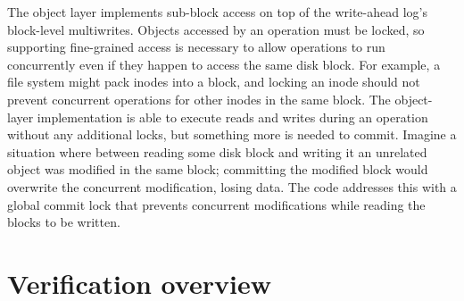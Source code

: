 The object layer implements sub-block access on top of the write-ahead
log's block-level multiwrites. Objects accessed by an operation must be locked,
so supporting fine-grained access is necessary to allow operations to run
concurrently even if they happen to access the same disk block. For example, a
file system might pack inodes into a block, and locking an inode should not
prevent concurrent operations for other inodes in the same block. The
object-layer implementation is able to execute reads and writes during an
operation without any additional locks, but something more is needed to commit.
Imagine a situation where between reading some disk block and writing it an
unrelated object was modified in the same block; committing the modified block
would overwrite the concurrent modification, losing data. The code addresses
this with a global commit lock that prevents concurrent modifications while
reading the blocks to be written.




\section{Verification overview}
\label{sec:overview}

